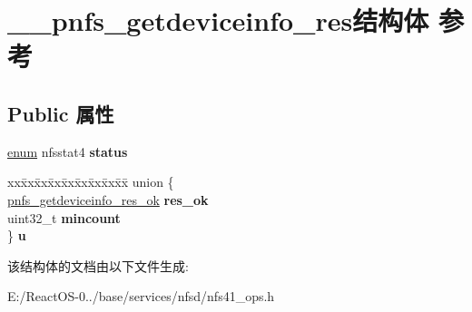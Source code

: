 \hypertarget{struct____pnfs__getdeviceinfo__res}{}\section{\+\_\+\+\_\+pnfs\+\_\+getdeviceinfo\+\_\+res结构体 参考}
\label{struct____pnfs__getdeviceinfo__res}
\subsection*{Public 属性}
\begin{DoxyCompactItemize}
\item 
\mbox{\label{struct____pnfs__getdeviceinfo__res_a8f796406b0715cf0f97cb72ad30675cd}} 
\hyperlink{interfaceenum}{enum} nfsstat4 {\bfseries status}
\item 
\mbox{\label{struct____pnfs__getdeviceinfo__res_a1ed48d68c2837ce82bc1e75956d41673}} 
\begin{tabbing}
xx\=xx\=xx\=xx\=xx\=xx\=xx\=xx\=xx\=\kill
union \{\\
\>\hyperlink{struct____pnfs__getdeviceinfo__res__ok}{pnfs\_getdeviceinfo\_res\_ok} {\bfseries res\_ok}\\
\>uint32\_t {\bfseries mincount}\\
\} {\bfseries u}\\

\end{tabbing}\end{DoxyCompactItemize}


该结构体的文档由以下文件生成\+:\begin{DoxyCompactItemize}
\item 
E\+:/\+React\+O\+S-\/0../base/services/nfsd/nfs41\+\_\+ops.\+h\end{DoxyCompactItemize}
